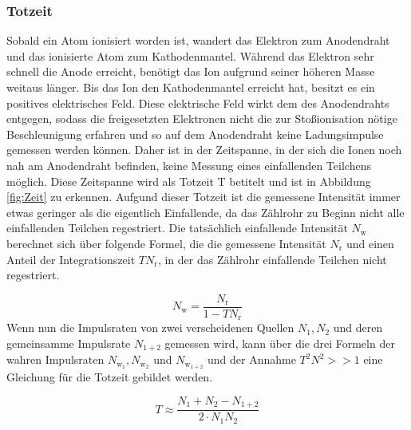 \documentclass[titlepage = firstcover]{scrartcl}
\begin{document}
            \subsubsection*{Totzeit}
                Sobald ein Atom ionisiert worden ist, wandert das Elektron zum Anodendraht und das ionisierte Atom zum Kathodenmantel. Während das Elektron sehr schnell die Anode erreicht, benötigt 
                das Ion aufgrund seiner höheren Masse weitaus länger. Bis das Ion den Kathodenmantel erreicht hat, besitzt es ein positives elektrisches Feld. Diese elektrische Feld wirkt dem des 
                Anodendrahts entgegen, sodass die freigesetzten Elektronen nicht die zur Stoßionisation nötige Beschleunigung erfahren und so auf dem Anodendraht keine Ladungsimpulse gemessen werden 
                können. Daher ist in der Zeitspanne, in der sich die Ionen noch nah am Anodendraht befinden, keine Messung eines einfallenden Teilchens möglich. Diese Zeitspanne wird als
                Totzeit T betitelt und ist in Abbildung \ref{fig:Zeit} zu erkennen. Aufgund dieser Totzeit ist die gemessene Intensität immer etwas geringer als die eigentlich Einfallende, da das
                Zählrohr zu Beginn nicht alle einfallenden Teilchen regestriert. Die tatsächlich einfallende Intensität $N_{\text{w}}$ berechnet sich über folgende Formel, die die gemessene Intensität 
                $N_{\text{r}}$ und einen Anteil der Integrationszeit $TN_{\text{r}}$, in der das Zählrohr einfallende Teilchen nicht regestriert.
                
                \begin{equation*}
                    N_{\text{w}} = \frac{N_{\text{r}}}{1-TN_{\text{r}}}
                \end{equation*}
                \noindent
                Wenn nun die Impulsraten von zwei verscheidenen Quellen $N_1, N_2$ und deren gemeinsamme Impulsrate $N_{1+2}$ gemessen wird, kann über die drei Formeln der wahren Impulsraten
                $N_{\text{w}_{1}}, N_{\text{w}_{2}}$ und $N_{\text{w}_{1+2}}$ und der Annahme $T^2N^2 >> 1$ eine Gleichung für die Totzeit gebildet werden.

                \begin{equation}
                    T \approx \frac{N_1 + N_2 - N_{1+2}}{2 \cdot N_1N_2}
                    \label{eqn:Totzeit}
                \end{equation}

                \noindent
\end{document}

